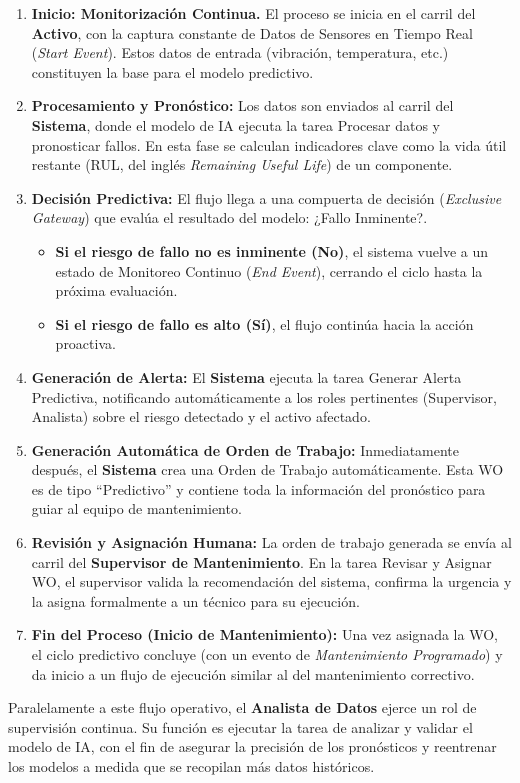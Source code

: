 \documentclass[12pt, a4paper]{article}
\begin{document}
\begin{enumerate}
    \item \textbf{Inicio: Monitorización Continua.} El proceso se inicia en el carril del \textbf{Activo}, con la captura constante de Datos de Sensores en Tiempo Real (\textit{Start Event}). Estos datos de entrada (vibración, temperatura, etc.) constituyen la base para el modelo predictivo.
    \item \textbf{Procesamiento y Pronóstico:} Los datos son enviados al carril del \textbf{Sistema}, donde el modelo de IA ejecuta la tarea Procesar datos y pronosticar fallos. En esta fase se calculan indicadores clave como la vida útil restante (RUL, del inglés \textit{Remaining Useful Life}) de un componente.
    \item \textbf{Decisión Predictiva:} El flujo llega a una compuerta de decisión (\textit{Exclusive Gateway}) que evalúa el resultado del modelo: ¿Fallo Inminente?.
    \begin{itemize}
        \item \textbf{Si el riesgo de fallo no es inminente (No)}, el sistema vuelve a un estado de Monitoreo Continuo (\textit{End Event}), cerrando el ciclo hasta la próxima evaluación.
        \item \textbf{Si el riesgo de fallo es alto (Sí)}, el flujo continúa hacia la acción proactiva.
    \end{itemize}
    \item \textbf{Generación de Alerta:} El \textbf{Sistema} ejecuta la tarea Generar Alerta Predictiva, notificando automáticamente a los roles pertinentes (Supervisor, Analista) sobre el riesgo detectado y el activo afectado.
    \item \textbf{Generación Automática de Orden de Trabajo:} Inmediatamente después, el \textbf{Sistema} crea una Orden de Trabajo automáticamente. Esta WO es de tipo ``Predictivo'' y contiene toda la información del pronóstico para guiar al equipo de mantenimiento.
    \item \textbf{Revisión y Asignación Humana:} La orden de trabajo generada se envía al carril del \textbf{Supervisor de Mantenimiento}. En la tarea Revisar y Asignar WO, el supervisor valida la recomendación del sistema, confirma la urgencia y la asigna formalmente a un técnico para su ejecución.
    \item \textbf{Fin del Proceso (Inicio de Mantenimiento):} Una vez asignada la WO, el ciclo predictivo concluye (con un evento de \textit{Mantenimiento Programado}) y da inicio a un flujo de ejecución similar al del mantenimiento correctivo.
\end{enumerate}

Paralelamente a este flujo operativo, el \textbf{Analista de Datos} ejerce un rol de supervisión continua. Su función es ejecutar la tarea de analizar y validar el modelo de IA, con el fin de asegurar la precisión de los pronósticos y reentrenar los modelos a medida que se recopilan más datos históricos.

\clearpage
\printbibliography[heading=bibintoc,title=Referencias]
\end{document}
